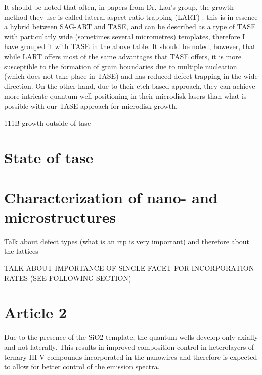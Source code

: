 It should be noted that often, in papers from Dr. Lau’s group, the growth method they use is called lateral aspect ratio trapping (LART) \cite{Han2020, Yan2021}: this is in essence a hybrid between SAG-ART and TASE, and can be described as a type of TASE with particularly wide (sometimes several micrometres) templates, therefore I have grouped it with TASE in the above table. It should be noted, however, that while LART offers most of the same advantages that TASE offers, it is more susceptible to the formation of grain boundaries due to multiple nucleation (which does not take place in TASE) and has reduced defect trapping in the wide direction. On the other hand, due to their etch-based approach, they can achieve more intricate quantum well positioning in their microdisk lasers than what is possible with our TASE approach for microdisk growth.



111B growth outside of tase

\section{\texorpdfstring{State of \acl{tase}}{State of template assisted selective epitaxy}}
\section{Characterization of nano- and microstructures}
Talk about defect types (what is an rtp is very important) and therefore about the lattices

TALK ABOUT IMPORTANCE OF SINGLE FACET FOR INCORPORATION RATES (SEE FOLLOWING SECTION)

\section{Article 2}

Due to the presence of the SiO2 template, the quantum wells
develop only axially and not laterally. This results in improved
composition control in heterolayers of ternary III-V
compounds incorporated in the nanowires\cite{Borg2019} and therefore is
expected to allow for better control of the emission spectra.